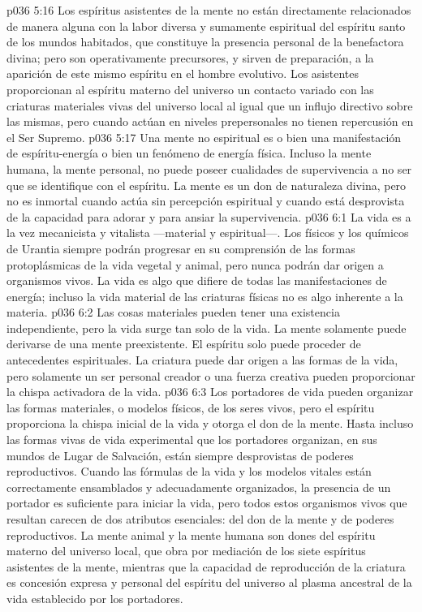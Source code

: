 \vs p036 5:16 Los espíritus asistentes de la mente no están directamente relacionados de manera alguna con la labor diversa y sumamente espiritual del espíritu santo de los mundos habitados, que constituye la presencia personal de la benefactora divina; pero son operativamente precursores, y sirven de preparación, a la aparición de este mismo espíritu en el hombre evolutivo. Los asistentes proporcionan al espíritu materno del universo un contacto variado con las criaturas materiales vivas del universo local al igual que un influjo directivo sobre las mismas, pero cuando actúan en niveles prepersonales no tienen repercusión en el Ser Supremo.
\vs p036 5:17 \pc Una mente no espiritual es o bien una manifestación de espíritu\hyp{}energía o bien un fenómeno de energía física. Incluso la mente humana, la mente personal, no puede poseer cualidades de supervivencia a no ser que se identifique con el espíritu. La mente es un don de naturaleza divina, pero no es inmortal cuando actúa sin percepción espiritual y cuando está desprovista de la capacidad para adorar y para ansiar la supervivencia.
\vs p036 6:1 La vida es a la vez mecanicista y vitalista ---material y espiritual---. Los físicos y los químicos de Urantia siempre podrán progresar en su comprensión de las formas protoplásmicas de la vida vegetal y animal, pero nunca podrán dar origen a organismos vivos. La vida es algo que difiere de todas las manifestaciones de energía; incluso la vida material de las criaturas físicas no es algo inherente a la materia.
\vs p036 6:2 Las cosas materiales pueden tener una existencia independiente, pero la vida surge tan solo de la vida. La mente solamente puede derivarse de una mente preexistente. El espíritu solo puede proceder de antecedentes espirituales. La criatura puede dar origen a las formas de la vida, pero solamente un ser personal creador o una fuerza creativa pueden proporcionar la chispa activadora de la vida.
\vs p036 6:3 Los portadores de vida pueden organizar las formas materiales, o modelos físicos, de los seres vivos, pero el espíritu proporciona la chispa inicial de la vida y otorga el don de la mente. Hasta incluso las formas vivas de vida experimental que los portadores organizan, en sus mundos de Lugar de Salvación, están siempre desprovistas de poderes reproductivos. Cuando las fórmulas de la vida y los modelos vitales están correctamente ensamblados y adecuadamente organizados, la presencia de un portador es suficiente para iniciar la vida, pero todos estos organismos vivos que resultan carecen de dos atributos esenciales: del don de la mente y de poderes reproductivos. La mente animal y la mente humana son dones del espíritu materno del universo local, que obra por mediación de los siete espíritus asistentes de la mente, mientras que la capacidad de reproducción de la criatura es concesión expresa y personal del espíritu del universo al plasma ancestral de la vida establecido por los portadores.
